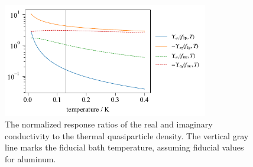 \begin{figure}[htb]
\centering
\includegraphics[width=0.8\textwidth]{theory/normresponse_conductivity_thermal.pdf}
\caption[The normalized response ratios of the real and imaginary conductivity to the thermal quasiparticle density.]
{
The normalized response ratios of the real and imaginary conductivity to the thermal quasiparticle density.
The vertical gray line marks the fiducial bath temperature, assuming fiducial values for aluminum.
}
\label{fig:normresponse_conductivity_thermal}
\end{figure}

